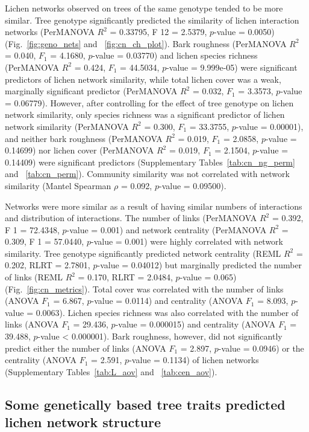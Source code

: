 \documentclass[9pt,twocolumn,twoside,lineno]{pnas-new}
\begin{document}
{Lichen networks observed on trees of the same genotype tended to be
more similar. Tree genotype significantly predicted the similarity of
lichen interaction networks (PerMANOVA $R^2$ = 0.33795, F 12 = 2.5379,
$p$-value = 0.0050) (Fig.~\ref{fig:geno_nets} and
~\ref{fig:cn_ch_plot}). Bark roughness (PerMANOVA $R^2$ = 0.040, $F_1$
= 4.1680, $p$-value = 0.03770) and lichen species richness (PerMANOVA
$R^2$ = 0.424, $F_1$ = 44.5034, $p$-value = 9.999e-05) were
significant predictors of lichen network similarity, while total
lichen cover was a weak, marginally significant predictor (PerMANOVA
$R^2$ = 0.032, $F_1$ = 3.3573, $p$-value = 0.06779). However, after
controlling for the effect of tree genotype on lichen network
similarity, only species richness was a significant predictor of
lichen network similarity (PerMANOVA $R^2$ = 0.300, $F_1$ = 33.3755,
$p$-value = 0.00001), and neither bark roughness (PerMANOVA $R^2$ =
0.019, $F_1$ = 2.0858, $p$-value = 0.14699) nor lichen cover
(PerMANOVA $R^2$ = 0.019, $F_1$ = 2.1504, $p$-value = 0.14409) were
significant predictors (Supplementary Tables~\ref{tab:cn_ng_perm} and
~\ref{tab:cn_perm}). Community similarity was not correlated with
network similarity (Mantel Spearman $\rho$ = 0.092, $p$-value =
0.09500).

Networks were more similar as a result of having similar numbers of
interactions and distribution of interactions. The number of links
(PerMANOVA $R^2$ = 0.392, F 1 = 72.4348, $p$-value = 0.001) and
network centrality (PerMANOVA $R^2$ = 0.309, F 1 = 57.0440, $p$-value
= 0.001) were highly correlated with network similarity.  Tree
genotype significantly predicted network centrality (REML $R^2$ =
0.202, RLRT = 2.7801, $p$-value = 0.04012) but marginally predicted
the number of links (REML $R^2$ = 0.170, RLRT = 2.0484, $p$-value =
0.065) (Fig.~\ref{fig:cn_metrics}). Total cover was correlated with
the number of links (ANOVA $F_1$ = 6.867, $p$-value = 0.0114) and
centrality (ANOVA $F_1$ = 8.093, $p$-value = 0.0063). Lichen species
richness was also correlated with the number of links (ANOVA $F_1$ =
29.436, $p$-value = 0.000015) and centrality (ANOVA $F_1$ = 39.488,
$p$-value < 0.000001). Bark roughness, however, did not significantly
predict either the number of links (ANOVA $F_1$ = 2.897, $p$-value =
0.0946) or the centrality (ANOVA $F_1$ = 2.591, $p$-value = 0.1134) of
lichen networks (Supplementary Tables~\ref{tab:L_aov} and
~\ref{tab:cen_aov}).


\subsection{Some genetically based tree traits predicted lichen
  network structure}

}
\end{document}
